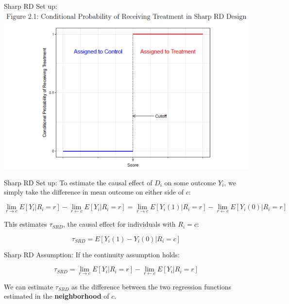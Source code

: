 \documentclass[
  ignorenonframetext,
]{beamer}
\begin{document}
\begin{frame}{Sharp RD Set up:}
\protect\hypertarget{sharp-rd-set-up-1}{}
\includegraphics{"images/sharpRD.png"}
\end{frame}

\begin{frame}{Sharp RD Set up:}
\protect\hypertarget{sharp-rd-set-up-2}{}
To estimate the causal effect of \(D_i\) on some outcome \(Y_i\), we
simply take the difference in mean outcome on either side of \(c\):

\footnotesize

\[
\lim\limits_{r \rightarrow c}E[Y_i|R_i=r]-\lim\limits_{r \leftarrow c}E[Y_i|R_i=r]=\lim\limits_{r \rightarrow c}E[Y_i(1)|R_i=r]-\lim\limits_{r \leftarrow c}E[Y_i(0)|R_i=r]
\]

\normalsize

This estimates \(\tau_{SRD}\), the causal effect for individuals with
\(R_i=c\):

\[
\tau_{SRD}=E[Y_i(1)-Y_i(0)|R_i=c]
\]
\end{frame}

\begin{frame}{Sharp RD Assumption:}
\protect\hypertarget{sharp-rd-assumption}{}
If the continuity assumption holds:

\[
\tau_{SRD}=\lim\limits_{r \rightarrow c}E[Y_i|R_i=r]-\lim\limits_{r \leftarrow c}E[Y_i|R_i=r]
\]

\bigskip

We can estimate \(\tau_{SRD}\) as the difference between the two
regression functions estimated in the \textbf{neighborhood} of \(c\).
\end{frame}
\end{document}
